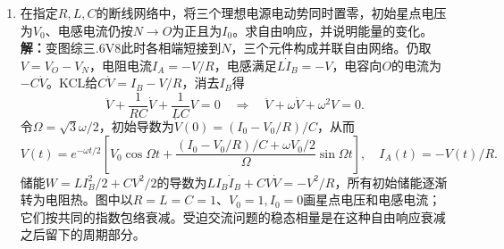\documentclass[UTF8,fontset=fandol,a4paper,11pt]{ctexart}
\begin{document}
\begin{enumerate}
\item 在指定$R,L,C$的断线网络中，将三个理想电源电动势同时置零，初始星点电压为$V_0$、电感电流仍按$N\to O$为正且为$I_0$。求自由响应，并说明能量的变化。
\textbf{解：}变图综三.6V8此时各相端短接到$N$，三个元件构成并联自由网络。仍取$V=V_O-V_N$，电阻电流$I_A=-V/R$，电感满足$L\dot I_B=-V$，电容向$O$的电流为$-C\dot V$。KCL给$C\dot V=I_B-V/R$，消去$I_B$得
\[
\ddot V+\frac1{RC}\dot V+\frac1{LC}V=0
\quad\Longrightarrow\quad \ddot V+\omega\dot V+\omega^2 V=0.
\]
令$\Omega=\sqrt3\omega/2$，初始导数为$\dot V(0)=(I_0-V_0/R)/C$，从而
\[
V(t)=e^{-\omega t/2}\left[V_0\cos\Omega t+
\frac{(I_0-V_0/R)/C+\omega V_0/2}{\Omega}\sin\Omega t\right],
\quad I_A(t)=-V(t)/R.
\]
储能$W=LI_B^2/2+CV^2/2$的导数为$LI_B\dot I_B+CV\dot V=-V^2/R$，所有初始储能逐渐转为电阻热。图中以$R=L=C=1$、$V_0=1,I_0=0$画星点电压和电感电流；它们按共同的指数包络衰减。受迫交流问题的稳态相量是在这种自由响应衰减之后留下的周期部分。
\begin{center}\begin{minipage}{.98\linewidth}\centering
{}
\end{minipage}
\end{center}
\end{enumerate}
\end{document}
